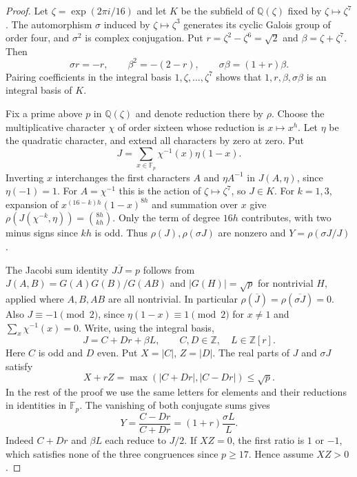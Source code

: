 \documentclass[11pt]{article}
\begin{document}
\begin{proof}
Let $\zeta=\exp(2\pi i/16)$ and let $K$ be the subfield of
$\mathbb Q(\zeta)$ fixed by $\zeta\mapsto\zeta^7$. The automorphism
$\sigma$ induced by $\zeta\mapsto\zeta^3$ generates its cyclic Galois
group of order four, and $\sigma^2$ is complex conjugation.
Put $r=\zeta^2-\zeta^6=\sqrt2$ and $\beta=\zeta+\zeta^7$.
Then
\[
 \sigma r=-r,\qquad \beta^2=-(2-r),\qquad
 \sigma\beta=(1+r)\beta .
\]
Pairing coefficients in the integral basis $1,\zeta,\dots,\zeta^7$
shows that $1,r,\beta,\sigma\beta$ is an integral basis of $K$.

Fix a prime above $p$ in $\mathbb Q(\zeta)$ and denote reduction there by
$\rho$. Choose the multiplicative character $\chi$ of order sixteen
whose reduction is $x\mapsto x^h$. Let $\eta$ be the quadratic
character, and extend all characters by zero at zero. Put
\[
 J=\sum_{x\in\mathbb F_p}\chi^{-1}(x)\eta(1-x).
\]
Inverting $x$ interchanges the first characters $A$ and $\eta A^{-1}$
in $J(A,\eta)$, since $\eta(-1)=1$. For $A=\chi^{-1}$ this is the
action of $\zeta\mapsto\zeta^7$, so $J\in K$.
For $k=1,3$, expansion of $x^{(16-k)h}(1-x)^{8h}$ and summation over
$x$ give $\rho(J(\chi^{-k},\eta))=\binom{8h}{kh}$.
Only the term of degree $16h$ contributes, with two minus signs
since $kh$ is odd. Thus $\rho(J),\rho(\sigma J)$ are nonzero
and $Y=\rho(\sigma J/J)$.

The Jacobi sum identity $J\overline J=p$ follows from
$J(A,B)=G(A)G(B)/G(AB)$ and $|G(H)|=\sqrt p$ for nontrivial $H$,
applied where $A,B,AB$ are all nontrivial. In particular
$\rho(\overline J)=\rho(\overline{\sigma J})=0$.
Also $J\equiv-1\pmod {2}$, since $\eta(1-x)\equiv1\pmod2$
for $x\ne1$ and $\sum_x\chi^{-1}(x)=0$.
Write, using the integral basis,
\[
 J=C+Dr+\beta L,\qquad C,D\in\mathbb Z,\quad L\in\mathbb Z[r].
\]
Here $C$ is odd and $D$ even. Put $X=|C|$, $Z=|D|$.
The real parts of $J$ and $\sigma J$ satisfy
\begin{equation}\label{eq:quartic-bound}
 X+rZ=\max(|C+Dr|,|C-Dr|)\le\sqrt p .
\end{equation}
In the rest of the proof we use the same letters for elements and
their reductions in identities in $\mathbb F_p$. The vanishing of
both conjugate sums gives
\begin{equation}\label{eq:quartic-ratio}
 Y=\frac{C-Dr}{C+Dr}=(1+r)\frac{\sigma L}{L}.
\end{equation}
Indeed $C+Dr$ and $\beta L$ each reduce to $J/2$. If $XZ=0$, the
first ratio is $1$ or $-1$, which satisfies none of the three
congruences since $p\ge17$. Hence assume $XZ>0$.


\end{proof}
\end{document}
